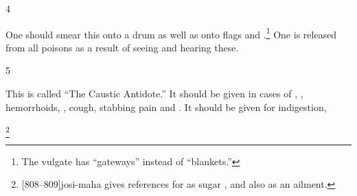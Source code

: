 \begin{translation}
\item[4]    

One should smear this onto a drum as well as onto flags and
.\footnote{The vulgate has  “gateways”
    instead of  “blankets.”} One is released from all
    poisons as a result of seeing and hearing these.    

\item[5]

This is called “The Caustic Antidote.” It should be given in cases of 
, , hemorrhoids, 
, 
cough, stabbing pain and .  It should be given
for indigestion, 

\footnote{[808--809]{josi-maha} gives references for  
as sugar \citep[see also][5-7--508]{meul-1974}, and also as an ailment.}
    
\end{translation}
